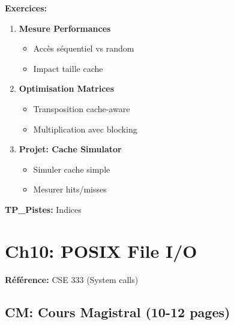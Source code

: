 \documentclass[10pt,a4paper]{article}
\begin{document}
\textbf{Exercices:}
\begin{enumerate}
\item \textbf{Mesure Performances}
   \begin{itemize}
   \item Accès séquentiel vs random
   \item Impact taille cache
   \end{itemize}

\item \textbf{Optimisation Matrices}
   \begin{itemize}
   \item Transposition cache-aware
   \item Multiplication avec blocking
   \end{itemize}

\item \textbf{Projet: Cache Simulator}
   \begin{itemize}
   \item Simuler cache simple
   \item Mesurer hits/misses
   \end{itemize}
\end{enumerate}

\textbf{TP\_Pistes:} Indices

\newpage

\section{Ch10: POSIX File I/O}

\textbf{Référence:} CSE 333 (System calls)

\subsection*{CM: Cours Magistral (10-12 pages)}
\end{document}
